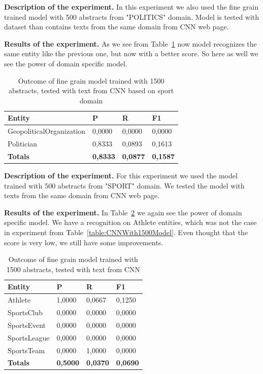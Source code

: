 \documentclass[thesis=M,english]{FITthesis}[2018/05/30]
\begin{document}
\textbf{Description of the experiment.} In this experiment we also used the fine grain trained model with 500 abstracts from "POLITICS" domain. Model is tested with dataset than contains texts from the same domain from CNN web page. 

\textbf{Results of the experiment.} As we see from Table~\ref{table:CNNPoliticsWith500PoliticsModel} now model recognizes the same entity like the previous one, but now with a better score. So here as well we see the power of domain specific model.

	
	\begin{table}[H]\centering
	\begin{tabular}{|l|l|l|l|}
		\hline {\textbf{Entity}} & {\textbf{P}} & {\textbf{R}} & {\textbf{F1}}\\\hline
		GeopoliticalOrganization & 0,0000 & 0,0000 & 0,0000\\
     	Politician & 0,8333 & 0,0893 & 0,1613\\
		\textbf{Totals} & \textbf{0,8333} & \textbf{0,0877} & \textbf{0,1587 }\\\hline
	\end{tabular}			
		\caption{Outcome of fine grain model trained with 1500 abstracts, tested with text from CNN based on sport domain\label{table:CNNPoliticsWith500PoliticsModel}}
	\end{table}
	

\textbf{Description of the experiment.}  For this experiment we used the model trained with 500 abstracts from "SPORT" domain. We tested the model with texts from the same domain from CNN web page.

\textbf{Results of the experiment.} In Table~\ref{table:CNNSportWith500SportModel} we again see the power of domain specific model. We have a recognition on Athlete entities, which was not the case in experiment from Table~\ref{table:CNNWith1500Model}. Even thought that the score is very low, we still have some improvements. 	
	
	\begin{table}[H]\centering
	\begin{tabular}{|l|l|l|l|}
		\hline {\textbf{Entity}} & {\textbf{P}} & {\textbf{R}} & {\textbf{F1}}\\\hline
        Athlete & 1,0000 & 0,0667 & 0,1250\\
		SportsClub & 0,0000 & 0,0000 & 0,0000\\
    	SportsEvent & 0,0000 & 0,0000 & 0,0000\\
   		SportsLeague & 0,0000 & 0,0000 & 0,0000\\
   		SportsTeam & 0,0000 & 1,0000 & 0,0000\\\hline  
		\textbf{Totals} & \textbf{0,5000} & \textbf{0,0370} & \textbf{0,0690}\\\hline
	\end{tabular}			
		\caption{Outcome of fine grain model trained with 1500 abstracts, tested with text from CNN\label{table:CNNSportWith500SportModel}}
	\end{table}
	
\end{document}
